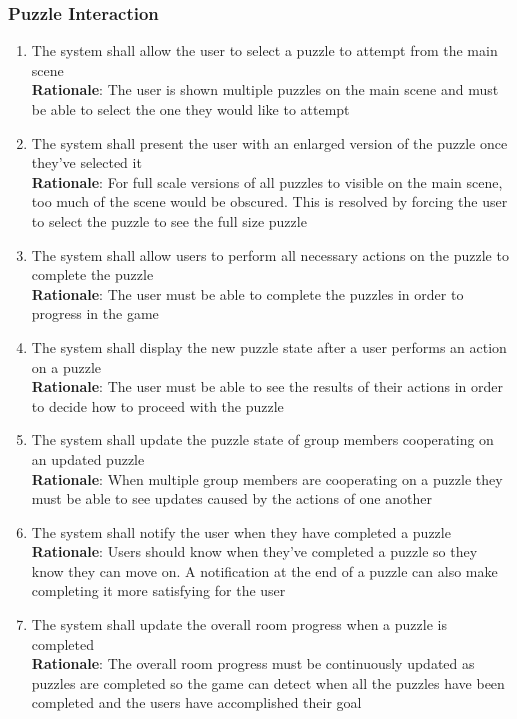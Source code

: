\documentclass[12pt]{article}
\begin{document}
\subsubsection{Puzzle Interaction}
    \begin{enumerate}[label=PI\arabic*., series=PuzzleInteract]
        \item The system shall allow the user to select a puzzle to attempt from the main scene\\
        \textbf{Rationale}: The user is shown multiple puzzles on the main scene and must be able to select the one they would like to attempt
        \item The system shall present the user with an enlarged version of the puzzle once they've selected it\\
        \textbf{Rationale}: For full scale versions of all puzzles to visible on the main scene, too much of the scene would be obscured. This is resolved by forcing the user to select the puzzle to see the full size puzzle
        \item The system shall allow users to perform all necessary actions on the puzzle to complete the puzzle\\
        \textbf{Rationale}: The user must be able to complete the puzzles in order to progress in the game
        \item The system shall display the new puzzle state after a user performs an action on a puzzle\\
        \textbf{Rationale}: The user must be able to see the results of their actions in order to decide how to proceed with the puzzle
        \item The system shall update the puzzle state of group members cooperating on an updated puzzle\\
        \textbf{Rationale}: When multiple group members are cooperating on a puzzle they must be able to see updates caused by the actions of one another
        \item The system shall notify the user when they have completed a puzzle\\
        \textbf{Rationale}: Users should know when they've completed a puzzle so they know they can move on. A notification at the end of a puzzle can also make completing it more satisfying for the user
        \item The system shall update the overall room progress when a puzzle is completed\\
        \textbf{Rationale}: The overall room progress must be continuously updated as puzzles are completed so the game can detect when all the puzzles have been completed and the users have accomplished their goal
    \end{enumerate}
\end{document}
